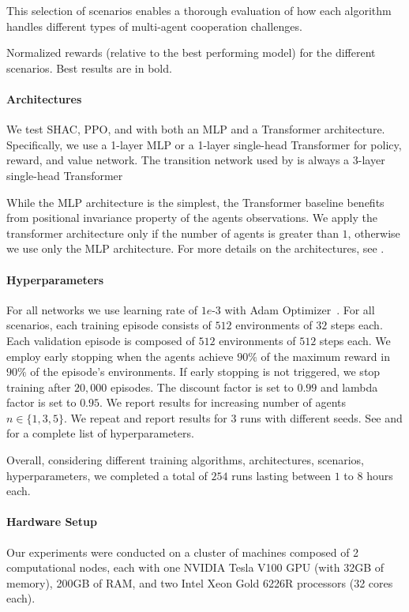 This selection of scenarios enables a thorough evaluation of how each algorithm handles different types of multi-agent cooperation challenges.

\begin{table}[t]
    \centering
    
    \caption{Normalized rewards (relative to the best performing model) for the different scenarios. Best results are in bold.}\label{tab:max-rewards}
\end{table}

\paragraph{Architectures}
We test SHAC, PPO, and \fname{} with both an MLP and a Transformer architecture. Specifically, we use a 1-layer MLP or a 1-layer single-head Transformer for policy, reward, and value network. The transition network used by \fname{} is always a 3-layer single-head Transformer

While the MLP architecture is the simplest, the Transformer baseline benefits from positional invariance property of the agents observations. We apply the transformer architecture only if the number of agents is greater than $1$, otherwise we use only the MLP architecture. For more details on the architectures, see .

\paragraph{Hyperparameters}
For all networks we use learning rate of $1e\text{-}3$ with Adam Optimizer~\cite{Kingma14}. For all scenarios, each training episode consists of $512$ environments of $32$ steps each. Each validation episode is composed of $512$ environments of $512$ steps each. We employ early stopping when the agents achieve $90\%$ of the maximum reward in $90\%$ of the episode's environments. If early stopping is not triggered, we stop training after $20,000$ episodes. The discount factor is set to $0.99$ and lambda factor is set to $0.95$. We report results for increasing number of agents $n\in\{1,3,5\}$. We repeat and report results for $3$ runs with different seeds. See  and  for a complete list of hyperparameters.

Overall, considering different training algorithms, architectures, scenarios, hyperparameters, we completed a total of $254$ runs lasting between $1$ to $8$ hours each. 

\paragraph{Hardware Setup}
Our experiments were conducted on a cluster of machines composed of 2 computational nodes, each with one NVIDIA Tesla V100 GPU (with 32GB of memory), 200GB of RAM, and two Intel Xeon Gold 6226R processors (32 cores each).

